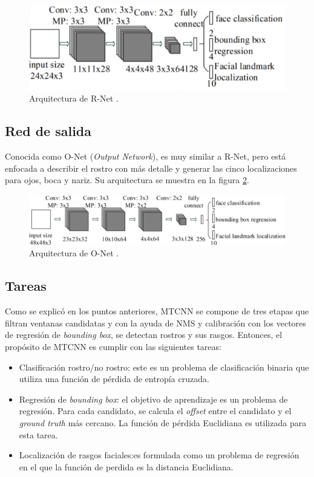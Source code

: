 \begin{figure}[h]
	\centering
	\includegraphics[scale=0.25]{./Figures/mtcnn_rnet.png}
	\caption{Arquitectura de R-Net \cite{mtcnn_info}.}
	\label{fig:mtcnn_rnet}
\end{figure}

\subsection{Red de salida}
Conocida como O-Net (\textit{Output Network}), es muy similar a R-Net, pero está enfocada a describir el rostro con más detalle y generar las cinco localizaciones para ojos, boca y nariz. Su arquitectura se muestra en la figura \ref{fig:mtcnn_onet}.

\begin{figure}[h]
	\centering
	\includegraphics[scale=0.3]{./Figures/mtcnn_onet.png}
	\caption{Arquitectura de O-Net \cite{mtcnn_info}.}
	\label{fig:mtcnn_onet}
\end{figure}

\subsection{Tareas}
Como se explicó en los puntos anteriores, MTCNN se compone de tres etapas que filtran ventanas candidatas y con la ayuda de NMS y calibración con los vectores de regresión de \textit{bounding box}, se detectan rostros y sus rasgos. Entonces, el propósito de MTCNN es cumplir con las siguientes tareas:
\begin{itemize}
	\item Clasificación rostro/no rostro: este es un problema de clasificación binaria que utiliza una función de pérdida de entropía cruzada.
	\item Regresión de \textit{bounding box}: el objetivo de aprendizaje es un problema de regresión. Para cada candidato, se calcula el \textit{offset} entre el candidato y el \textit{ground truth} \cite{ground_truth} más cercano. La función de pérdida Euclidiana es utilizada para esta tarea.
	\item Localización de rasgos faciales:es formulada como un problema de regresión en el que la función de perdida es la distancia Euclidiana.
\end{itemize}

